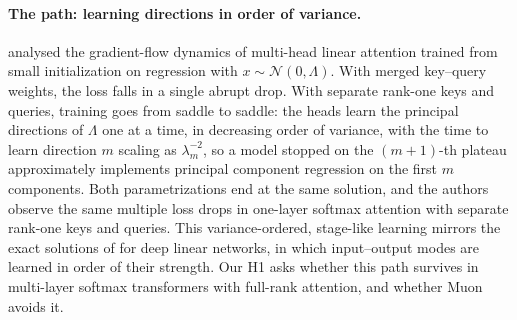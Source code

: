 \paragraph{The path: learning directions in order of variance.} \citet{zhang2025training} analysed the gradient-flow dynamics of multi-head linear attention trained from small initialization on regression with $x \sim \mathcal N(0, \Lambda)$. With merged key--query weights, the loss falls in a single abrupt drop. With separate rank-one keys and queries, training goes from saddle to saddle: the heads learn the principal directions of $\Lambda$ one at a time, in decreasing order of variance, with the time to learn direction $m$ scaling as $\lambda_m^{-2}$, so a model stopped on the $(m{+}1)$-th plateau approximately implements principal component regression on the first $m$ components. Both parametrizations end at the same solution, and the authors observe the same multiple loss drops in one-layer softmax attention with separate rank-one keys and queries. This variance-ordered, stage-like learning mirrors the exact solutions of \citet{saxe2014} for deep linear networks, in which input--output modes are learned in order of their strength. Our H1 asks whether this path survives in multi-layer softmax transformers with full-rank attention, and whether Muon avoids it.


